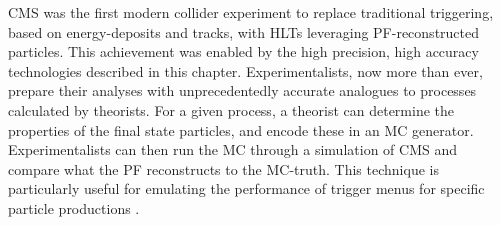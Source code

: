 CMS was the first modern collider experiment to replace traditional triggering, based on energy-deposits and tracks, with HLTs leveraging PF-reconstructed particles. This achievement was enabled by the high precision, high accuracy technologies described in this chapter. Experimentalists, now more than ever, prepare their analyses with unprecedentedly accurate analogues to processes calculated by theorists. For a given process, a theorist can determine the properties of the final state particles, and encode these in an MC generator. Experimentalists can then run the MC through a simulation of CMS and compare what the PF reconstructs to the MC-truth. This technique is particularly useful for emulating the performance of trigger menus for specific particle productions \cite{Beaudette:2014cea}. 